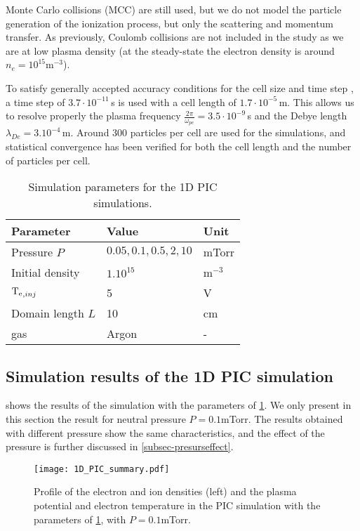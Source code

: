     Monte Carlo collisions (MCC) are still used, but we do not model the particle generation of the ionization process, but only the scattering and momentum transfer.
    As previously, Coulomb collisions are not included in the study as we are at low plasma density (at the steady-state the electron density is around $n_e = 10^{15}$m$^{-3}$).

    To satisfy generally accepted accuracy conditions for the cell size and time step \citep{turner2013}, a time step of $3.7\cdot10^{-11}$\,s is used with a cell length of $1.7\cdot10^{-5}$\,m.
    This allows us to resolve properly the plasma frequency $\frac{2 \pi}{\omega_{pe}} = 3.5\cdot10^{-9} $\,s and the Debye length $\lambda_{De} = 3.10^{-4}$\,m.
    Around $300$ particles per cell are used for the simulations, and statistical convergence has been verified for both the cell length and the number of particles per cell.


    \begin{table}
      \centering
      \begin{tabular}{lll}  \toprule
        Parameter & Value & Unit  \\ \midrule
        Pressure $P$ & $0.05,0.1,0.5, 2, 10$ & mTorr\\
        Initial density & $1 .10^{15}$ & m$^{-3}$\\
        $\mathrm{T_e}_{, inj}$& 5 & V\\
        Domain length $L$ & 10 & cm\\
        gas & Argon & -\\
        \bottomrule
      \end{tabular}
      \caption{Simulation parameters for the 1D PIC simulations.}
      \label{tab_1DPICParams}
    \end{table}


  \subsection{Simulation results of the \acs{1D} \acs{PIC} simulation} \label{subsec-1DPIC_results}

     shows the results of the simulation with the parameters of \cref{tab_1DPICParams}.
    We only present in this section the result for neutral pressure $P=0.1$mTorr.
    The results obtained with different pressure show the same characteristics, and the effect of the pressure is further discussed in \cref{subsec-presurseffect}.
    
    \begin{figure}[htbp]
      \centering
      \texttt{[image: 1D\_PIC\_summary.pdf]}
      \caption{Profile of the electron and ion densities (left) and the plasma potential and electron temperature in the PIC simulation with the parameters of \cref{tab_1DPICParams}, with $P=0.1$mTorr.}
      \label{fig-PIC1}
    \end{figure}


